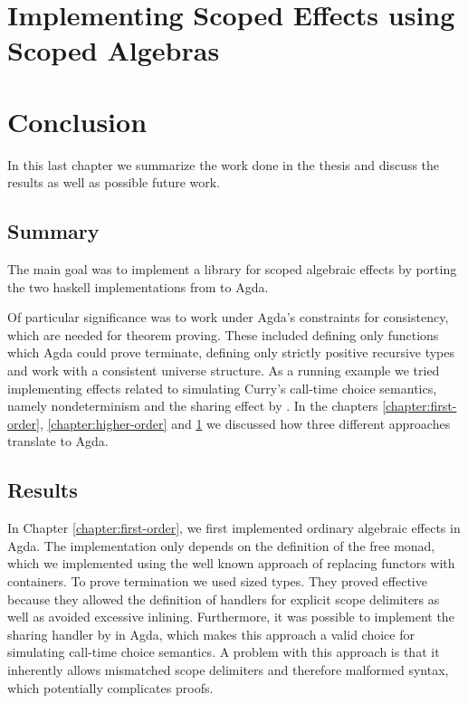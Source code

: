 \documentclass[10pt,a4paper,twoside,notitlepage]{report}
\begin{document}
\chapter{Implementing Scoped Effects using Scoped Algebras}
\label{chapter:scoped-algebras}


\chapter{Conclusion}
\label{chapter:conclusion}

In this last chapter we summarize the work done in the thesis and discuss the
results as well as possible future work.

\section{Summary}

The main goal was to implement a library for scoped algebraic effects by
porting the two haskell implementations from
 to Agda.

Of particular significance was to work under Agda's constraints for consistency,
which are needed for theorem proving.
These included defining only functions which Agda could prove terminate, defining
only strictly positive recursive types and work with a consistent universe
structure.
As a running example we tried implementing effects related to simulating Curry's
call-time choice semantics, namely nondeterminism and the sharing effect by
\textcite{bunkenburg2019modeling}.
In the chapters \ref{chapter:first-order}, \ref{chapter:higher-order} and
\ref{chapter:scoped-algebras} we discussed how three different approaches
translate to Agda.


\section{Results}

In Chapter \ref{chapter:first-order}, we first implemented ordinary algebraic
effects in Agda.
The implementation only depends on the definition of the free monad, which
we implemented using the well known approach of replacing functors with
containers.
To prove termination we used sized types.
They proved effective because they allowed the definition of
\textcite{DBLP:conf/haskell/WuSH14} handlers for
explicit scope delimiters as well as avoided excessive inlining.
Furthermore, it was possible to implement the sharing handler by
\textcite{bunkenburg2019modeling} in Agda, which makes this approach a valid choice
for simulating call-time choice semantics.
A problem with this approach is that it inherently allows mismatched scope
delimiters and therefore malformed syntax, which potentially complicates proofs.
\end{document}
